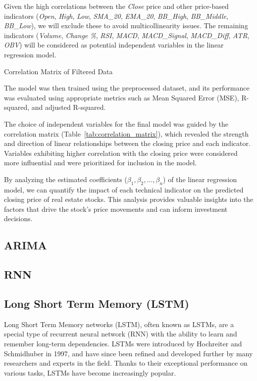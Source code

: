 \documentclass{ieeeojies}
\begin{document}
Given the high correlations between the \textit{Close} price and other price-based indicators (\textit{Open}, \textit{High}, \textit{Low}, \textit{SMA\_20}, \textit{EMA\_20}, \textit{BB\_High}, \textit{BB\_Middle}, \textit{BB\_Low}), we will exclude these to avoid multicollinearity issues. The remaining indicators (\textit{Volume}, \textit{Change \%}, \textit{RSI}, \textit{MACD}, \textit{MACD\_Signal}, \textit{MACD\_Diff}, \textit{ATR}, \textit{OBV}) will be considered as potential independent variables in the linear regression model. 

\begin{table}[ht]
\centering
\caption{Correlation Matrix of Filtered Data}
\label{tab:correlation_matrix}

\end{table}

The model was then trained using the preprocessed dataset, and its performance was evaluated using appropriate metrics such as Mean Squared Error (MSE), R-squared, and adjusted R-squared.

The choice of independent variables for the final model was guided by the correlation matrix (Table~\ref{tab:correlation_matrix}), which revealed the strength and direction of linear relationships between the closing price and each indicator. Variables exhibiting higher correlation with the closing price were considered more influential and were prioritized for inclusion in the model.

By analyzing the estimated coefficients (\( \beta_1, \beta_2, ..., \beta_n \)) of the linear regression model, we can quantify the impact of each technical indicator on the predicted closing price of real estate stocks. This analysis provides valuable insights into the factors that drive the stock's price movements and can inform investment decisions.
  \subsection{ARIMA}
  \subsection{RNN}
  \subsection{Long Short Term Memory (LSTM)}

   Long Short Term Memory networks (LSTM), often known as LSTMs, are a special type of recurrent neural network (RNN) with the ability to learn and remember long-term dependencies. LSTMs were introduced by Hochreiter and Schmidhuber in 1997, and have since been refined and developed further by many researchers and experts in the field. Thanks to their exceptional performance on various tasks, LSTMs have become increasingly popular.
\end{document}
